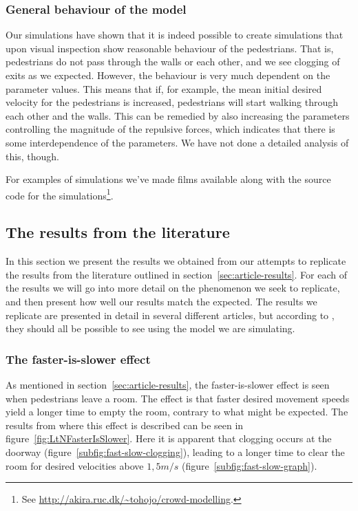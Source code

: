 \subsubsection{General behaviour of the model}
Our simulations have shown that it is indeed possible to create simulations 
that upon visual inspection show reasonable behaviour of the pedestrians. That 
is, pedestrians do not pass through the walls or each other, and we see 
clogging of exits as we expected. However, the behaviour is very much 
dependent on the parameter values. This means that if, for example, the mean 
initial desired velocity for the pedestrians is increased, pedestrians will 
start walking through each other and the walls. This can be remedied by also 
increasing the parameters controlling the magnitude of the repulsive forces, 
which indicates that there is some interdependence of the parameters. We have 
not done a detailed analysis of this, though.

For examples of simulations we've made films available along with the source 
code for the simulations\footnote{See 
\url{http://akira.ruc.dk/~tohojo/crowd-modelling}.}.

\subsection{The results from the literature}\label{subsec:ThePhenomena}
In this section we present the results we obtained from our attempts
to replicate the results from the literature outlined in 
section~\ref{sec:article-results}.  For each of the results we will go into 
more detail on the phenomenon we seek to replicate, and then present how well 
our results match the expected. The results we replicate are presented in 
detail in several different articles, but according to \cite{self-org}, they 
should all be possible to see using the model we are simulating.

\subsubsection{The faster-is-slower effect}
As mentioned in section~\ref{sec:article-results}, the faster-is-slower effect 
is seen when pedestrians leave a room. The effect is that faster desired 
movement speeds yield a longer time to empty the room, contrary to what might 
be expected. The results from \cite{helbing00} where this effect is described 
can be seen in figure~\ref{fig:LtNFasterIsSlower}. Here it is apparent that 
clogging occurs at the doorway (figure~\ref{subfig:fast-slow-clogging}), 
leading to a longer time to clear the room for desired velocities above 
$1,5m/s$ (figure~\ref{subfig:fast-slow-graph}).

